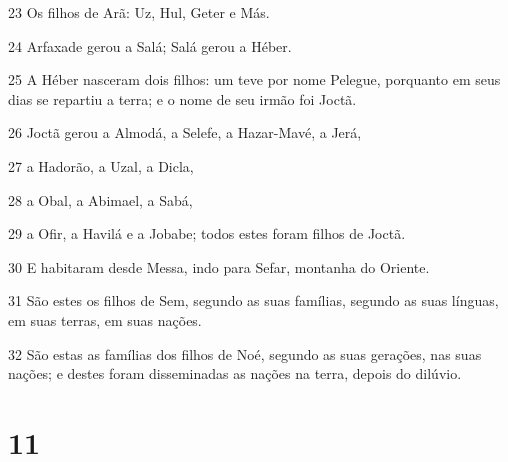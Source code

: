 \par 23 Os filhos de Arã: Uz, Hul, Geter e Más.
\par 24 Arfaxade gerou a Salá; Salá gerou a Héber.
\par 25 A Héber nasceram dois filhos: um teve por nome Pelegue, porquanto em seus dias se repartiu a terra; e o nome de seu irmão foi Joctã.
\par 26 Joctã gerou a Almodá, a Selefe, a Hazar-Mavé, a Jerá,
\par 27 a Hadorão, a Uzal, a Dicla,
\par 28 a Obal, a Abimael, a Sabá,
\par 29 a Ofir, a Havilá e a Jobabe; todos estes foram filhos de Joctã.
\par 30 E habitaram desde Messa, indo para Sefar, montanha do Oriente.
\par 31 São estes os filhos de Sem, segundo as suas famílias, segundo as suas línguas, em suas terras, em suas nações.
\par 32 São estas as famílias dos filhos de Noé, segundo as suas gerações, nas suas nações; e destes foram disseminadas as nações na terra, depois do dilúvio.

\chapter{11}

